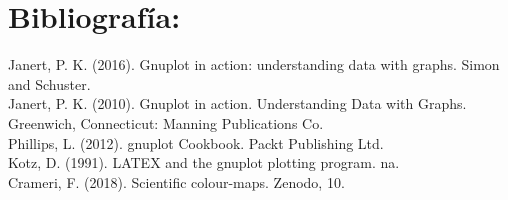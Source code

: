 \documentclass[11.5pt,a4paper]{article}
\begin{document}
\newpage
\section{Bibliografía:}

\vspace{2.0cm}
Janert, P. K. (2016). Gnuplot in action: understanding data with graphs. Simon and Schuster.\\

Janert, P. K. (2010). Gnuplot in action. Understanding Data with Graphs. Greenwich, Connecticut: Manning Publications Co.\\

Phillips, L. (2012). gnuplot Cookbook. Packt Publishing Ltd.\\

Kotz, D. (1991). LATEX and the gnuplot plotting program. na.\\

Crameri, F. (2018). Scientific colour-maps. Zenodo, 10.
\end{document}
